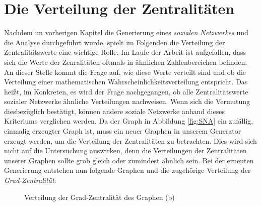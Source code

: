\section{Die Verteilung der Zentralitäten}
Nachdem im vorherigen Kapitel die Generierung eines \textit{sozialen Netzwerkes} und die Analyse durchgeführt wurde, spielt im Folgenden die Verteilung der Zentralitätswerte eine wichtige Rolle.
Im Laufe der Arbeit ist aufgefallen, dass sich die Werte der Zenralitäten oftmals in ähnlichen Zahlenbereichen befinden. An dieser Stelle kommt die Frage auf, wie diese Werte verteilt sind und ob die Verteilung einer mathematischen Wahrscheinlichkeitsverteilung entspricht. Das heißt, im Konkreten, es wird der Frage nachgegangen, ob alle Zentralitätswerte sozialer Netzwerke ähnliche Verteilungen nachweisen. Wenn sich die Vermutung diesbezüglich bestätigt, können andere soziale Netzwerke anhand dieses Kriteriums verglichen werden.
Da der Graph in Abbildung \ref{fig:SNA} ein zufällig, einmalig erzeugter Graph ist, muss ein neuer Graphen in unserem Generator erzeugt werden, um die Verteilung der Zentralitäten zu betrachten. Dies wird sich nicht auf die Untersuchung auswirken, denn die Verteilungen der Zentralitäten unserer Graphen sollte grob gleich oder zumindest ähnlich sein. Bei der erneuten Generierung entstehen nun folgende Graphen und die zugehörige Verteilung der \textit{Grad-Zentralität}:

\FloatBarrier
\begin{figure}[h!]%
  \centering
  \qquad
  \caption{Verteilung der Grad-Zentralität des Graphen (b)}%
  \label{fig:distribution}
\end{figure}
\FloatBarrier

